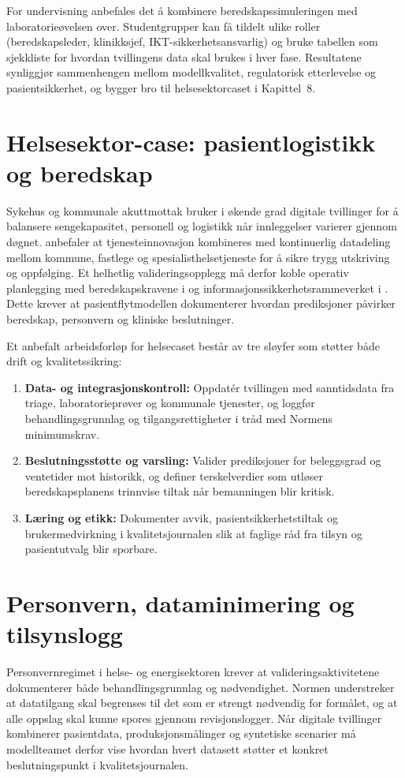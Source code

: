 For undervisning anbefales det å kombinere beredskapssimuleringen med laboratorieøvelsen over. Studentgrupper kan få tildelt ulike roller (beredskapsleder, klinikksjef, IKT-sikkerhetsansvarlig) og bruke tabellen som sjekkliste for hvordan tvillingens data skal brukes i hver fase. Resultatene synliggjør sammenhengen mellom modellkvalitet, regulatorisk etterlevelse og pasientsikkerhet, og bygger bro til helsesektorcaset i Kapittel~8.

\section{Helsesektor-case: pasientlogistikk og beredskap}
Sykehus og kommunale akuttmottak bruker i økende grad digitale tvillinger for å balansere sengekapasitet, personell og logistikk når innleggelser varierer gjennom døgnet. \citet{helsedir2020dho} anbefaler at tjenesteinnovasjon kombineres med kontinuerlig datadeling mellom kommune, fastlege og spesialisthelsetjeneste for å sikre trygg utskriving og oppfølging. Et helhetlig valideringsopplegg må derfor koble operativ planlegging med beredskapskravene i \citet{hod2020beredskap} og informasjonssikkerhetsrammeverket i \citet{norm2023}. Dette krever at pasientflytmodellen dokumenterer hvordan prediksjoner påvirker beredskap, personvern og kliniske beslutninger.

Et anbefalt arbeidsforløp for helsecaset består av tre sløyfer som støtter både drift og kvalitetssikring:
\begin{enumerate}
    \item \textbf{Data- og integrasjonskontroll:} Oppdatér tvillingen med sanntidsdata fra triage, laboratorieprøver og kommunale tjenester, og loggfør behandlingsgrunnlag og tilgangsrettigheter i tråd med Normens minimumskrav.
    \item \textbf{Beslutningsstøtte og varsling:} Valider prediksjoner for beleggsgrad og ventetider mot historikk, og definer terskelverdier som utløser beredskapsplanens trinnvise tiltak når bemanningen blir kritisk.
    \item \textbf{Læring og etikk:} Dokumenter avvik, pasientsikkerhetstiltak og brukermedvirkning i kvalitetsjournalen slik at faglige råd fra tilsyn og pasientutvalg blir sporbare.
\end{enumerate}

\section{Personvern, dataminimering og tilsynslogg}
Personvernregimet i helse- og energisektoren krever at valideringsaktivitetene dokumenterer både behandlingsgrunnlag og nødvendighet. Normen understreker at datatilgang skal begrenses til det som er strengt nødvendig for formålet, og at alle oppslag skal kunne spores gjennom revisjonslogger.\citep{norm2023} Når digitale tvillinger kombinerer pasientdata, produksjonsmålinger og syntetiske scenarier må modellteamet derfor vise hvordan hvert datasett støtter et konkret beslutningspunkt i kvalitetsjournalen.

